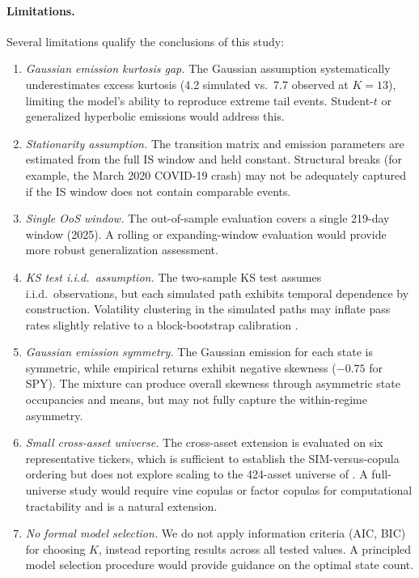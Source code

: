 \paragraph{Limitations.}
Several limitations qualify the conclusions of this study:
\begin{enumerate}
    \item \textit{Gaussian emission kurtosis gap.}
    The Gaussian assumption systematically underestimates excess kurtosis (4.2 simulated vs.\ 7.7 observed at $K = 13$), limiting the model's ability to reproduce extreme tail events.
    Student-$t$ or generalized hyperbolic emissions would address this.

    \item \textit{Stationarity assumption.}
    The transition matrix and emission parameters are estimated from the full IS window and held constant.
    Structural breaks (for example, the March 2020 COVID-19 crash) may not be adequately captured if the IS window does not contain comparable events.

    \item \textit{Single OoS window.}
    The out-of-sample evaluation covers a single 219-day window (2025).
    A rolling or expanding-window evaluation would provide more robust generalization assessment.

    \item \textit{KS test i.i.d.\ assumption.}
    The two-sample KS test assumes i.i.d.\ observations, but each simulated path exhibits temporal dependence by construction.
    Volatility clustering in the simulated paths may inflate pass rates slightly relative to a block-bootstrap calibration \cite{alswaidan2026hybrid}.

    \item \textit{Gaussian emission symmetry.}
    The Gaussian emission for each state is symmetric, while empirical returns exhibit negative skewness ($-0.75$ for SPY).
    The mixture can produce overall skewness through asymmetric state occupancies and means, but may not fully capture the within-regime asymmetry.

    \item \textit{Small cross-asset universe.}
    The cross-asset extension is evaluated on six representative tickers, which is sufficient to establish the SIM-versus-copula ordering but does not explore scaling to the 424-asset universe of \citet{alswaidan2026hybrid}.
    A full-universe study would require vine copulas or factor copulas for computational tractability and is a natural extension.

    \item \textit{No formal model selection.}
    We do not apply information criteria (AIC, BIC) for choosing $K$, instead reporting results across all tested values.
    A principled model selection procedure would provide guidance on the optimal state count.
\end{enumerate}
